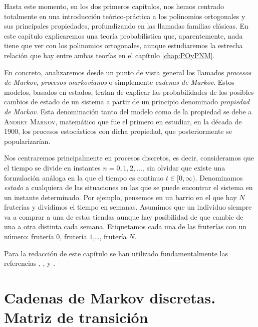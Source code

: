 %
%

Hasta este momento, en los dos primeros capítulos, nos hemos centrado totalmente en una introducción teórico-práctica a los polinomios ortogonales y sus principales propiedades, profundizando en las llamadas familias clásicas. En este capítulo explicaremos una teoría probabilística que, aparentemente, nada tiene que ver con los polinomios ortogonales, aunque estudiaremos la estrecha relación que hay entre ambas teorías en el capítulo \ref{chap:POyPNM}.

En concreto, analizaremos desde un punto de vista general los llamados \textit{procesos de Markov, procesos markovianos} o simplemente \textit{cadenas de Markov}. Estos modelos, basados en estados, tratan de explicar las probabilidades de los posibles cambios de estado de un sistema a partir de  un principio denominado \textit{propiedad de Markov}. Esta denominación tanto del modelo como de la propiedad se debe a \textsc{Andrey Markov}, matemático que fue el primero en estudiar, en la década de 1900, los procesos estocásticos con dicha propiedad, que posteriormente se popularizarían.

Nos centraremos principalmente en procesos discretos, es decir, consideramos que el tiempo se divide en instantes $n=0,1,2,\dots$, sin olvidar que existe una formulación análoga en la que el tiempo es continuo $t\in[0,\infty)$. Denominamos \textit{estado} a cualquiera de las situaciones en las que se puede encontrar el sistema en un instante determinado. Por ejemplo, pensemos en un barrio en el que hay $N$ fruterías y dividimos el tiempo en semanas. Asumimos que un individuo siempre va a comprar a una de estas tiendas aunque hay posibilidad de que cambie de una a otra distinta cada semana. Etiquetamos cada una de las fruterías con un número: frutería $0$, frutería $1$,\dots, frutería $N$.

Para la redacción de este capítulo se han utilizado fundamentalmente las referencias \cite{Ross}, \cite{schoutens-2000}, \cite{kulkarni-2012} y \cite{Manuel}.

\section{Cadenas de Markov discretas. Matriz de transición}

